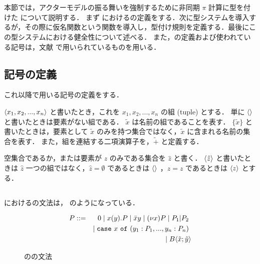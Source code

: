 \section{\api}

本節では，アクターモデルの振る舞いを強制するために非同期 $\pi$ 計算に型を付けた \api について説明する．
まず \api における\conf の定義をする．次に型システムを導入するが，その際に仮名関数という関数を導入し，型付け規則を定義する．最後にこの型システムにおける健全性について述べる．
また，\api の定義および使われている記号は，文献\cite[Dean2008]{Agha:2004aa} で用いられているものを用いる．

\subsection{記号の定義}

これ以降で用いる記号の定義をする．

\begin{dfn}[組]
  $\langle x_1,x_2,...,x_n \rangle$ と書いたとき，これを $x_1, x_2, ..., x_n$ の組 (tuple) とする．
  単に $\langle  \rangle$ と書いたときは要素がない組である．
  $\tilde{x}$ は名前の組であることを表す．
  $\{\tilde{x}\}$ と書いたときは，要素として $\tilde{x}$ のみを持つ集合ではなく，$\tilde{x}$ に含まれる名前の集合を表す．
  また，組を連結する二項演算子を，$\tilde{+}$ と定義する．
\end{dfn}

\begin{dfn}
  空集合であるか，または要素が $z$ のみである集合を $\hat{z}$ と書く．
  $\langle \hat{z} \rangle$ と書いたときは $\hat{z}$ 一つの組ではなく，$\hat{z} = \emptyset$ であるときは $\langle  \rangle$ ，$\hat{z} = {z}$ であるときは $\langle z \rangle$ とする．
\end{dfn}

\subsection{\conf}

\api における\conf の文法は， のようになっている．

\begin{figure}[h]
  \begin{eqnarray}
    P & ::= & \nilconf \mid \actorconf{x}{y}{P} \mid \sendconf{x}{y} \mid \restrictconf{x}{P} \mid \composeconf{P_1}{P_2} \ \nonumber \\
    & & \mid \caseconf{x}{y_1 : P_1 ,..., y_n : P_n} \ \nonumber \\
    & & \mid \behaviorconf{\tilde{x}}{\tilde{y}} \nonumber
  \end{eqnarray}
  \caption{\api の\conf の文法}
  \label{api_config}
\end{figure}

